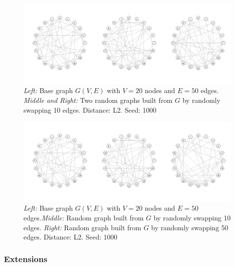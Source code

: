 \begin{figure}[htb]
	\begin{center}
		\includegraphics[width=1\linewidth]{ch-gc/figures/sim_10vs10}
		\caption[Random graphs with 20 nodes and 50 edges. Edges have been 
		swapped 10 times each.]{\textit{Left:} Base graph $G(V,E)$ with $V=20$ 
		nodes and $E=50$ edges. \textit{Middle and Right:} Two random graphs 
		built from $G$ by randomly swapping 10 edges. Distance: L2. Seed: 1000}
		\label{fig:gc:sim10vs10}
	\end{center}
\end{figure}

\begin{figure}[htb]
	\begin{center}
		\includegraphics[width=1\linewidth]{ch-gc/figures/sim_10vs50}
		\caption[Random graphs with 20 nodes and 50 edges. Edges have been 
		swapped 10 and 50 times respectively.]{\textit{Left:} Base graph 
		$G(V,E)$ with $V=20$ nodes and $E=50$ edges.\textit{Middle:} Random 
		graph built from $G$ by randomly swapping 10 edges. \textit{Right:} 
		Random graph built from $G$ by randomly swapping 50 edges. 
		Distance: L2. Seed: 1000}
		\label{fig:gc:sim10vs50}
	\end{center}
\end{figure}

\subsubsection{Extensions}

